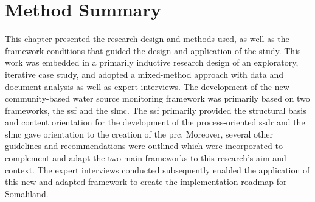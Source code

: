
\section{Method Summary}

This chapter presented the research design and methods used, as well as the framework conditions that guided the design and application of the study. This work was embedded in a primarily inductive research design of an exploratory, iterative case study, and adopted a mixed-method approach with data and document analysis as well as expert interviews. The development of the new community-based water source monitoring framework was primarily based on two frameworks, the \acrfull{ssf} and the \acrfull{slmc}. The \acrshort{ssf} primarily provided the structural basis and content orientation for the development of the process-oriented \acrlong{ssdr} and the \acrshort{slmc} gave orientation to the creation of the \acrlong{prc}. Moreover, several other guidelines and recommendations were outlined which were incorporated to complement and adapt the two main frameworks to this research's aim and context. The expert interviews conducted subsequently enabled the application of this new and adapted framework to create the implementation roadmap for Somaliland.

